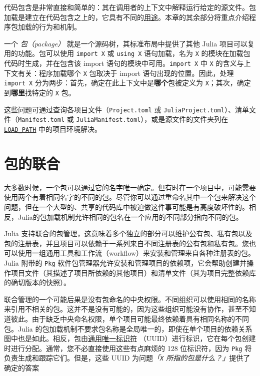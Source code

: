 代码包含是非常直接和简单的：其在调用者的上下文中解释运行给定的源文件。包加载是建立在代码包含之上的，它具有不同的\hyperlink{16725527896995457152}{用途}。本章的其余部分将重点介绍程序包加载的行为和机制。



一个 \emph{包（package）} 就是一个源码树，其标准布局中提供了其他 Julia 项目可以复用的功能。包可以使用 \texttt{import X} 或 \texttt{using X} 语句加载，名为 \texttt{X} 的模块在加载包代码时生成，并在包含该 import 语句的模块中可用。\texttt{import X} 中 \texttt{X} 的含义与上下文有关：程序加载哪个 \texttt{X} 包取决于 import 语句出现的位置。因此，处理 \texttt{import X} 分为两步：首先，确定在此上下文中是\textbf{哪个}包被定义为 \texttt{X}；其次，确定到\textbf{哪里}找特定的 \texttt{X} 包。



这些问题可通过查询各项目文件（\texttt{Project.toml} 或 \texttt{JuliaProject.toml}）、清单文件（\texttt{Manifest.toml} 或 \texttt{JuliaManifest.toml}），或是源文件的文件夹列在\hyperlink{17914149694871263675}{\texttt{LOAD\_PATH}} 中的项目环境解决。



\hypertarget{6907225830267322072}{}


\section{包的联合}



大多数时候，一个包可以通过它的名字唯一确定。但有时在一个项目中，可能需要使用两个有着相同名字的不同的包。尽管你可以通过重命名其中一个包来解决这个问题，但在一个大型的、共享的代码库中被迫做这件事可能是有高度破坏性的。相反，Julia的包加载机制允许相同的包名在一个应用的不同部分指向不同的包。



Julia 支持联合的包管理，这意味着多个独立的部分可以维护公有包、私有包以及包的注册表，并且项目可以依赖于一系列来自不同注册表的公有包和私有包。您也可以使用一组通用工具和工作流（workflow）来安装和管理来自各种注册表的包。Julia 附带的 \texttt{Pkg} 软件包管理器允许安装和管理项目的依赖项，它会帮助创建并操作项目文件（其描述了项目所依赖的其他项目）和清单文件（其为项目完整依赖库的确切版本的快照）。



联合管理的一个可能后果是没有包命名的中央权限。不同组织可以使用相同的名称来引用不相关的包。这并不是没有可能的，因为这些组织可能没有协作，甚至不知道彼此。由于缺乏中央命名权限，单个项目可能最终依赖着具有相同名称的不同包。Julia 的包加载机制不要求包名称是全局唯一的，即使在单个项目的依赖关系图中也是如此。相反，包由\href{https://en.wikipedia.org/wiki/Universally\_unique\_identifier}{通用唯一标识符} （UUID）进行标识，它在每个包创建时进行分配。通常，您不必直接使用这些有点麻烦的 128 位标识符，因为 \texttt{Pkg} 将负责生成和跟踪它们。但是，这些 UUID 为问题\emph{「\texttt{X} 所指的包是什么？」}提供了确定的答案




